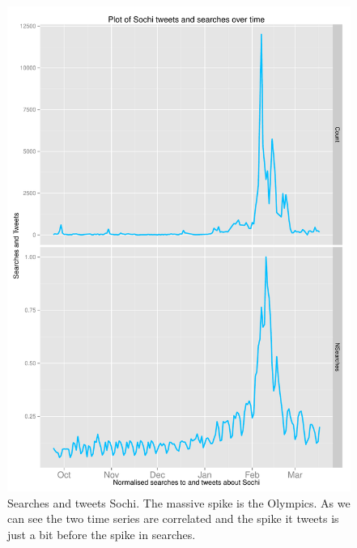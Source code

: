 \documentclass[minf,twoside,singlespacing,parskip,frontabs,notimes,11pt]{infthesis}
\begin{document}
\begin{figure}[]
\begin{center}
\includegraphics[scale=0.75]{Sochi-s-c}
\end{center}
\caption{Searches and tweets Sochi. The massive spike is the Olympics. As we can see the two time series are correlated and the spike it tweets is just a bit before the spike in searches.}
\label{sochi-c-s}
\end{figure}
\end{document}
